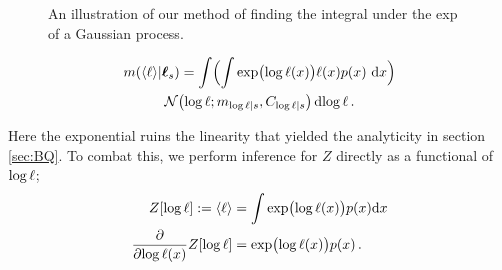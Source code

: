 \documentclass{article}
\begin{document}
 \begin{figure}
 \centering
 \caption{An illustration of our method of finding the integral under the exp of a Gaussian process.}
 \label{fig:integrate_hypers}
 \end{figure}


%
%
%
\begin{multline}\label{eq:minty_l}
\mean{\inty{\lfn}}{\vr_s}
 =\int \Bigl( \int \exp\bigl(\tr(\lfv)\bigr)\lfn(\lfv)\po{\lfv}\,\ud\lfv\Bigr)\\
\N{\tr}{\meancondfn{\tr}{s}}{C_{\tr|s}} \ud \tr\,.
\end{multline}

Here the exponential ruins the linearity that yielded the analyticity in section \ref{sec:BQ}. To combat this, we perform inference for $Z$ directly as a functional of $\tr$;
%
\begin{align*}
 Z[\tr] \deq \inty{\lfn} & = \int \exp \bigl( \tr(\lfv)\bigr) p(\lfv) \ud \lfv\\
\pderiv{}{\tr(\lfv)}Z[\tr] & = \exp \bigl( \tr(\lfv)\bigr) p(\lfv) %
\,.
\end{align*}
\end{document}

